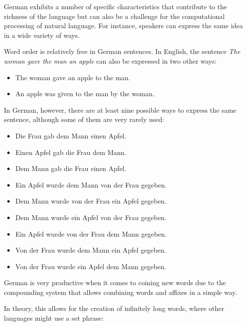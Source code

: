 \documentclass[]{../../metanetpaper}
\begin{document}
\begin{multicols}{2}
German exhibits a number of specific characteristics that contribute to the richness of the language but can also be a challenge for the computational processing of natural language. For instance, speakers can express the same idea in a wide variety of ways.


Word order is relatively free in German sentences. In English, the sentence \textit{The woman gave the man an apple} can also be expressed in two other ways:
    
\begin{itemize}    
\item The woman gave an apple to the man.
\item An apple was given to the man by the woman.
\end{itemize}


In German, however, there are at least nine possible ways to express the same sentence, although some of them are very rarely used:

\begin{itemize}    
\item Die Frau gab dem Mann einen Apfel.
\item Einen Apfel gab die Frau dem Mann.
\item Dem Mann gab die Frau einen Apfel.
\item Ein Apfel wurde dem Mann von der Frau gegeben.
\item Dem Mann wurde von der Frau ein Apfel gegeben.
\item Dem Mann wurde ein Apfel von der Frau gegeben.
\item Ein Apfel wurde von der Frau dem Mann gegeben.
\item Von der Frau wurde dem Mann ein Apfel gegeben.
\item Von der Frau wurde ein Apfel dem Mann gegeben.
\end{itemize}
 
German is very productive when it comes to coining new words due to the compounding system that allows combining words and affixes in a simple way. 


In theory, this allows for the creation of infinitely long words, where other languages might use a set phrase:


\end{multicols}
\end{document}
